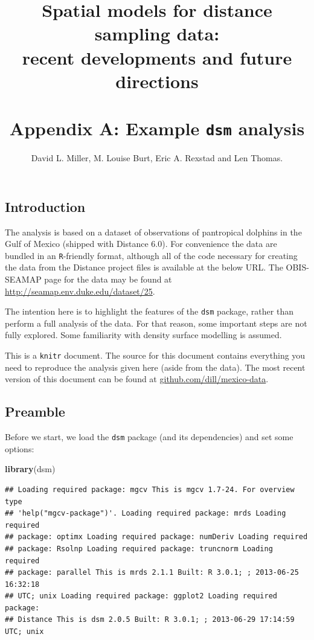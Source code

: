 \documentclass[]{amsart}
\title{{\Small Spatial models for distance sampling data: \\ recent developments and future directions}\\ \mbox{} \\ Appendix A: Example \texttt{dsm} analysis}
\author{David L. Miller, M. Louise Burt, Eric A. Rexstad and Len
Thomas.}
\newenvironment{Shaded}{}{}
\newcommand{\KeywordTok}[1]{\textcolor[rgb]{0.00,0.44,0.13}{\textbf{{#1}}}}
\newcommand{\NormalTok}[1]{{#1}}
\begin{document}
\maketitle

\subsection{Introduction}

The analysis is based on a dataset of observations of pantropical
dolphins in the Gulf of Mexico (shipped with Distance 6.0). For
convenience the data are bundled in an \texttt{R}-friendly format,
although all of the code necessary for creating the data from the
Distance project files is available at the below URL. The OBIS-SEAMAP
page for the data may be found at
\url{http://seamap.env.duke.edu/dataset/25}.

The intention here is to highlight the features of the \texttt{dsm}
package, rather than perform a full analysis of the data. For that
reason, some important steps are not fully explored. Some familiarity
with density surface modelling is assumed.

This is a \texttt{knitr} document. The source for this document contains
everything you need to reproduce the analysis given here (aside from the
data). The most recent version of this document can be found at
\href{http://github.com/dill/mexico-data}{github.com/dill/mexico-data}.

\subsection{Preamble}

Before we start, we load the \texttt{dsm} package (and its dependencies)
and set some options:

\begin{Shaded}
\begin{Highlighting}[]
\KeywordTok{library}\NormalTok{(dsm)}
\end{Highlighting}
\end{Shaded}

\begin{verbatim}
## Loading required package: mgcv This is mgcv 1.7-24. For overview type
## 'help("mgcv-package")'. Loading required package: mrds Loading required
## package: optimx Loading required package: numDeriv Loading required
## package: Rsolnp Loading required package: truncnorm Loading required
## package: parallel This is mrds 2.1.1 Built: R 3.0.1; ; 2013-06-25 16:32:18
## UTC; unix Loading required package: ggplot2 Loading required package:
## Distance This is dsm 2.0.5 Built: R 3.0.1; ; 2013-06-29 17:14:59 UTC; unix
\end{verbatim}
\end{document}
